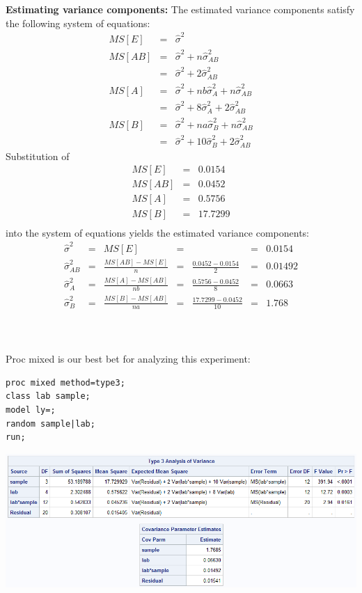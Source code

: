 \textbf{Estimating variance components:}
The estimated variance components satisfy the following system of equations:
\begin{eqnarray*}
MS[E] & = & \hat\sigma^2 \\
MS[AB] & = & \hat\sigma^2 + n\hat\sigma_{AB}^2 \\
& = & \hat\sigma^2 + 2\hat\sigma_{AB}^2 \\
MS[A] & = & \hat\sigma^2 + nb \hat\sigma_A^2+n\hat\sigma_{AB}^2 \\
& = & \hat\sigma^2 + 8 \hat\sigma_A^2 + 2\hat\sigma_{AB}^2 \\
MS[B] & = & \hat\sigma^2 + na \hat\sigma_B^2+n\hat\sigma_{AB}^2 \\
& = & \hat\sigma^2 + 10 \hat\sigma_B^2 + 2\hat\sigma_{AB}^2 
\end{eqnarray*}
Substitution of 
\begin{eqnarray*}
MS[E] & = & 0.0154 \\
MS[AB] & = & 0.0452 \\
MS[A] & = & 0.5756 \\
MS[B] & = & 17.7299 \\
\end{eqnarray*}
into the system of equations yields the estimated variance components:
\[
\begin{array}{ccccccc}
\hat\sigma^2 &=& MS[E] &=&  &=& 0.0154 \\
\hat\sigma_{AB}^2 &=& \frac{MS[AB]-MS[E]}{n} &=&
\frac{0.0452-0.0154}{2} &=& 0.01492 \\
\hat\sigma_{A}^2 &=& \frac{MS[A]-MS[AB]}{nb} &=&
\frac{0.5756 - 0.0452}{8} &=& 0.0663 \\ 
\hat\sigma_{B}^2 &=& \frac{MS[B]-MS[AB]}{na} &=&
\frac{17.7299 - 0.0452}{10} &=& 1.768 
\end{array}\]
~\\~\\~\\
Proc mixed is our best bet for analyzing this experiment:
\begin{small}
\begin{verbatim}
proc mixed method=type3; 
class lab sample;
model ly=;
random sample|lab; 
run;
\end{verbatim}
\end{small}

\begin{center}
\includegraphics[scale=0.7]{MilkMixed}
\end{center}

